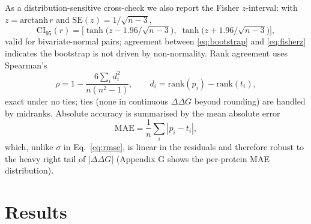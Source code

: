 \documentclass[11pt]{article}
\begin{document}
As a distribution-sensitive cross-check we also report the Fisher
$z$-interval: with $z = \mathrm{arctanh}\, r$ and
$\mathrm{SE}(z)=1/\sqrt{n-3}$,
\begin{equation}
\mathrm{CI}_{95}(r) = \Big[\tanh\big(z - 1.96/\sqrt{n-3}\big),\;
\tanh\big(z + 1.96/\sqrt{n-3}\big)\Big],
\label{eq:fisherz}
\end{equation}
valid for bivariate-normal pairs; agreement between \eqref{eq:bootstrap}
and \eqref{eq:fisherz} indicates the bootstrap is not driven by
non-normality. Rank agreement uses Spearman's
\begin{equation}
\rho = 1 - \frac{6\sum_i d_i^2}{n(n^2-1)},
\qquad d_i = \mathrm{rank}(p_i)-\mathrm{rank}(t_i),
\label{eq:spearman}
\end{equation}
exact under no ties; ties (none in continuous $\Delta\Delta G$ beyond
rounding) are handled by midranks. Absolute accuracy is summarised by the
mean absolute error
\begin{equation}
\mathrm{MAE} = \frac{1}{n}\sum_i |p_i - t_i|,
\label{eq:mae}
\end{equation}
which, unlike $\sigma$ in Eq.~\eqref{eq:rmse}, is linear in the residuals
and therefore robust to the heavy right tail of $|\Delta\Delta G|$
(Appendix G shows the per-protein MAE distribution).

\section{Results}
\label{sec:results}
\end{document}
